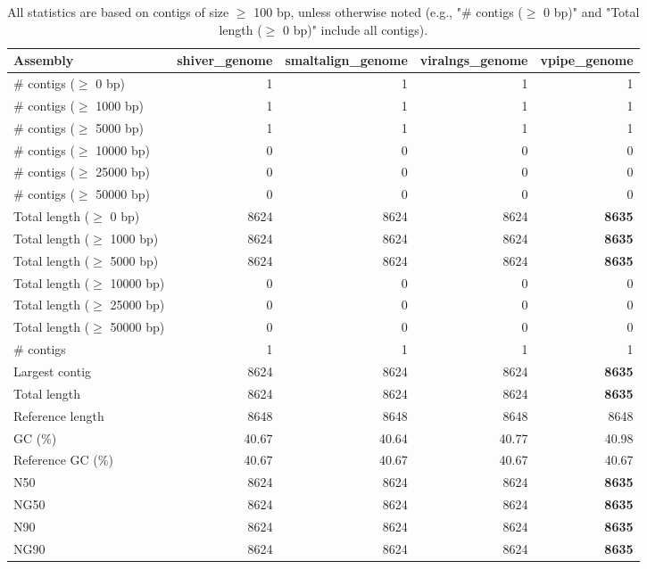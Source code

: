 \documentclass[12pt,a4paper]{article}
\begin{document}
\begin{table}[ht]
\begin{center}
\caption{All statistics are based on contigs of size $\geq$ 100 bp, unless otherwise noted (e.g., "\# contigs ($\geq$ 0 bp)" and "Total length ($\geq$ 0 bp)" include all contigs).}
\begin{tabular}{|l*{4}{|r}|}
\hline
Assembly & shiver\_genome & smaltalign\_genome & viralngs\_genome & vpipe\_genome \\ \hline
\# contigs ($\geq$ 0 bp) & 1 & 1 & 1 & 1 \\ \hline
\# contigs ($\geq$ 1000 bp) & 1 & 1 & 1 & 1 \\ \hline
\# contigs ($\geq$ 5000 bp) & 1 & 1 & 1 & 1 \\ \hline
\# contigs ($\geq$ 10000 bp) & 0 & 0 & 0 & 0 \\ \hline
\# contigs ($\geq$ 25000 bp) & 0 & 0 & 0 & 0 \\ \hline
\# contigs ($\geq$ 50000 bp) & 0 & 0 & 0 & 0 \\ \hline
Total length ($\geq$ 0 bp) & 8624 & 8624 & 8624 & {\bf 8635} \\ \hline
Total length ($\geq$ 1000 bp) & 8624 & 8624 & 8624 & {\bf 8635} \\ \hline
Total length ($\geq$ 5000 bp) & 8624 & 8624 & 8624 & {\bf 8635} \\ \hline
Total length ($\geq$ 10000 bp) & 0 & 0 & 0 & 0 \\ \hline
Total length ($\geq$ 25000 bp) & 0 & 0 & 0 & 0 \\ \hline
Total length ($\geq$ 50000 bp) & 0 & 0 & 0 & 0 \\ \hline
\# contigs & 1 & 1 & 1 & 1 \\ \hline
Largest contig & 8624 & 8624 & 8624 & {\bf 8635} \\ \hline
Total length & 8624 & 8624 & 8624 & {\bf 8635} \\ \hline
Reference length & 8648 & 8648 & 8648 & 8648 \\ \hline
GC (\%) & 40.67 & 40.64 & 40.77 & 40.98 \\ \hline
Reference GC (\%) & 40.67 & 40.67 & 40.67 & 40.67 \\ \hline
N50 & 8624 & 8624 & 8624 & {\bf 8635} \\ \hline
NG50 & 8624 & 8624 & 8624 & {\bf 8635} \\ \hline
N90 & 8624 & 8624 & 8624 & {\bf 8635} \\ \hline
NG90 & 8624 & 8624 & 8624 & {\bf 8635} \\ \hline

\end{tabular}
\end{center}
\end{table}
\end{document}
